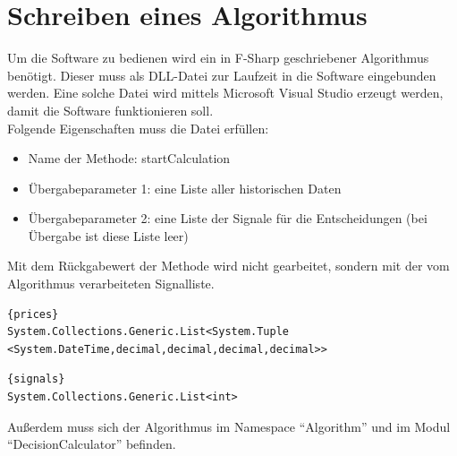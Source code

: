 \section{Schreiben eines Algorithmus}
Um die Software zu bedienen wird ein in \gls{F-Sharp} geschriebener Algorithmus benötigt. Dieser muss als \gls{DLL}-Datei zur Laufzeit in die Software eingebunden werden. Eine solche Datei wird mittels Microsoft Visual Studio erzeugt werden, damit die Software funktionieren soll. \\
Folgende Eigenschaften muss die Datei erfüllen:
\begin{itemize}
	\item Name der Methode: startCalculation
	\item Übergabeparameter 1: eine Liste aller historischen Daten 
	\item Übergabeparameter 2: eine Liste der Signale für die Entscheidungen (bei Übergabe ist diese Liste leer)
\end{itemize}
Mit dem Rückgabewert der Methode wird nicht gearbeitet, sondern mit der vom Algorithmus verarbeiteten Signalliste.

\begin{lstlisting}[caption=Dateityp des 1. Übergabeparameters]{prices}
System.Collections.Generic.List<System.Tuple
<System.DateTime,decimal,decimal,decimal,decimal>>
\end{lstlisting}
\begin{lstlisting}[caption=Dateityp des 2. Übergabeparameters]{signals}
System.Collections.Generic.List<int>
\end{lstlisting}
Außerdem muss sich der Algorithmus im Namespace  "`Algorithm"' und im Modul "`DecisionCalculator"' befinden.
